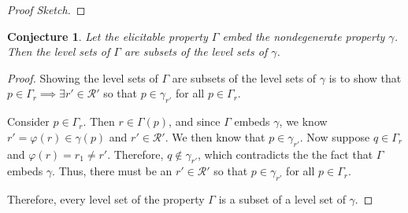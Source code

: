\documentclass[12pt]{article}
\newcommand{\R}{\mathcal{R}}
\newcommand{\inter}[1]{\mathring{#1}}%
\newcommand{\trim}{\mathrm{trim}}
\newcommand{\strip}{\mathrm{strip}}
\newtheorem{conjecture}{Conjecture}
\begin{document}
\begin{proof}[Proof Sketch]
%		
%		
	
\end{proof}


\begin{conjecture}\label{conj:lev-sets-subsets}
	Let the elicitable property $\Gamma$ embed the nondegenerate property $\gamma$.
	Then the level sets of $\Gamma$ are subsets of the level sets of $\gamma$.
\end{conjecture}

\begin{proof}
	Showing the level sets of $\Gamma$ are subsets of the level sets of $\gamma$ is to show that $p \in \Gamma_r \implies \exists r' \in \R'$ so that $p \in \gamma_{r'}$ for all $p \in \Gamma_r$.
	
	Consider $p \in \Gamma_r$.
	Then $r \in \Gamma(p)$, and since $\Gamma$ embeds $\gamma$, we know $ r' = \varphi(r) \in \gamma(p)$ and $r' \in \R'$.
	We then know that $p \in \gamma_{r'}$.
	Now suppose $q \in \Gamma_r$ and $\varphi(r) = r_1 \neq r'$.
	Therefore, $q \not \in \gamma_{r'}$, which contradicts the the fact that $\Gamma$ embeds $\gamma$.
	Thus, there must be an $r' \in \R'$ so that $p \in \gamma_{r'}$ for all $p \in \Gamma_r$.
	
	Therefore, every level set of the property $\Gamma$ is a subset of a level set of $\gamma$.
\end{proof}
\end{document}
